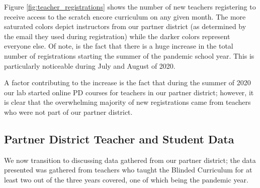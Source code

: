 \documentclass[sigconf,manuscript,review,anonymous]{acmart} %
\newcommand{\Scratchencore}[0]{Blinded Curriculum}
\begin{document}
Figure \ref{fig:teacher_registrations} shows the number of new teachers registering to
receive access to the scratch encore curriculum on any given month. The more saturated
colors depict instructors from our partner district (as determined by the email they used
during registration) while the darker colors represent everyone else. 
Of note, is the fact that there is a huge increase in the total number of registrations starting
the summer of the pandemic school year. This is particularly noticeable during July and
August of 2020. 

A factor contributing to the increase is the fact that during the summer
of 2020 our lab started online PD courses for teachers in our partner district; however,
it is clear that the overwhelming majority of new registrations came from teachers who
were not part of our partner district. 

\subsection{Partner District Teacher and Student Data}
We now transition to discussing data gathered from our partner district; the data presented
was gathered from teachers who taught the \Scratchencore{} for at least two out
of the three years covered, one of which being the pandemic year.
\end{document}
